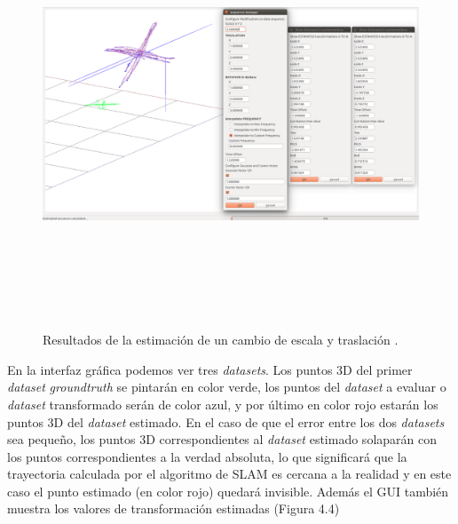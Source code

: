 \begin{figure}[H]
\begin{center}
\label{fig:opciones de View}\includegraphics[height=12.0cm,width=17.0cm]{img/cap6/Escala_Trasla_Rota_Offset_Gauss_CosmicNoise_abba.png}
\hspace{0.5cm}

\end{center}

\caption{Resultados de la estimación de un cambio de escala y traslación .}
\end{figure}

En la interfaz gráfica podemos ver tres \textit{datasets}. Los puntos 3D del primer \textit{dataset} \textit{groundtruth} se pintarán en color verde, los puntos del \textit{dataset} a evaluar o \textit{dataset} transformado serán de color azul, y por último en color rojo estarán los puntos 3D del \textit{dataset} estimado.
En el caso de que el error entre los dos \textit{datasets} sea pequeño, los puntos 3D correspondientes al \textit{dataset} estimado solaparán con los puntos correspondientes a la verdad absoluta, lo que significará que la trayectoria calculada por el algoritmo de SLAM es cercana a la realidad y en este caso el punto estimado (en color rojo) quedará invisible. Además el GUI también muestra los valores de transformación estimadas (Figura 4.4)




